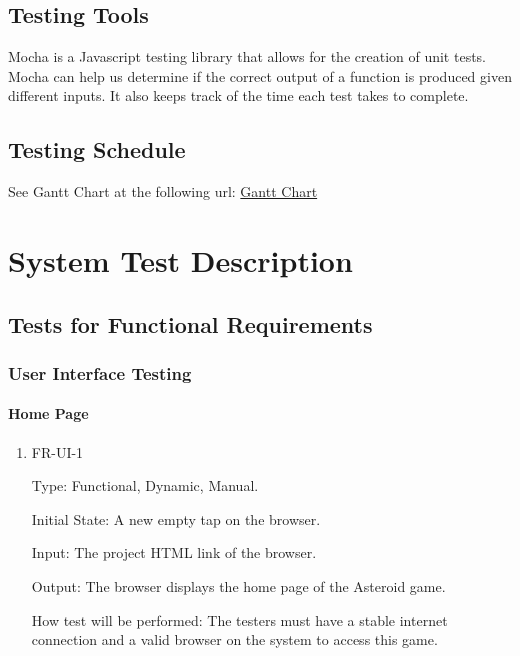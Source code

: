 \documentclass[12pt, titlepage]{article}
\begin{document}
\subsection{Testing Tools}
Mocha is a Javascript testing library that allows for the creation of unit tests. Mocha can help us determine if the correct output of a function is produced given different inputs. It also keeps track of the time each test takes to complete.
\subsection{Testing Schedule}
		
See Gantt Chart at the following url:
\href{https://gitlab.cas.mcmaster.ca/mait6/3xa3-lab3-group-12/-/tree/master/BlankProjectTemplate/ProjectSchedule}{Gantt Chart}

\section{System Test Description}
	
\subsection{Tests for Functional Requirements}

\subsubsection{User Interface Testing}
		
\paragraph{Home Page}

\begin{enumerate}

\item{FR-UI-1\\}

Type: Functional, Dynamic, Manual.
					
Initial State: A new empty tap on the browser.
					
Input: The project HTML link of the browser.
					
Output: The browser displays the home page of the Asteroid game.
					
How test will be performed: The testers must have a stable internet connection and a valid browser on the system to access this game.
\\
\end{enumerate}
\end{document}
